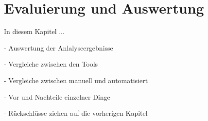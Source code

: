 \chapter{Evaluierung und Auswertung}

In diesem Kapitel ...

- Auswertung der Anlalyseergebnisse 

- Vergleiche zwischen den Tools

- Vergleiche zwischen manuell und automatisiert

- Vor und Nachteile einzelner Dinge

- Rückschlüsse ziehen auf die vorherigen Kapitel


